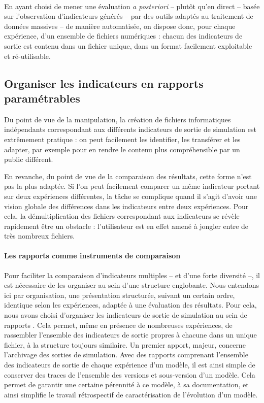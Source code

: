 	\paragraph*{}
	En ayant choisi de mener une évaluation \textit{a posteriori} -- plutôt qu'en direct -- basée sur l'observation d'indicateurs générés -- par des outils adaptés au traitement de données massives -- de manière automatisée, on dispose donc, pour chaque expérience, d'un ensemble de fichiers numériques : chacun des indicateurs  de sortie est contenu dans un fichier unique, dans un format facilement exploitable et ré-utilisable. 

	\subsection{Organiser les indicateurs en rapports paramétrables}

	Du point de vue de la manipulation, la création de fichiers informatiques indépendants correspondant aux différents indicateurs de sortie de simulation est extrêmement pratique : on peut facilement les identifier, les transférer et les adapter, par exemple pour en rendre le contenu plus compréhensible par un public différent.

	En revanche, du point de vue de la comparaison des résultats, cette forme n'est pas la plus adaptée.
	Si l'on peut facilement comparer un même indicateur portant sur deux expériences différentes, la tâche se complique quand il s'agit d'avoir une vision globale des différences dans les indicateurs entre deux expériences.
	Pour cela, la démultiplication des fichiers correspondant aux indicateurs se révèle rapidement être un obstacle : l'utilisateur est en effet amené à jongler entre de très nombreux fichiers.
	
	\paragraph{Les rapports comme instruments de comparaison}
	Pour faciliter la comparaison d'indicateurs multiples -- et d'une forte diversité --, il est nécessaire de les organiser au sein d'une structure englobante.
	Nous entendons ici par organisation, une présentation structurée, suivant un certain ordre, identique selon les expériences, adaptée à une évaluation des résultats.
	Pour cela, nous avons choisi d'organiser les indicateurs de sortie de simulation au sein de \og rapports \fg{}.
	Cela permet, même en présence de nombreuses expériences, de rassembler l'ensemble des indicateurs de sortie propres à chacune dans un unique fichier, à la structure toujours similaire.
	Un premier apport, majeur, concerne l'archivage des sorties de simulation.
	Avec des rapports comprenant l'ensemble des indicateurs de sortie de chaque expérience d'un modèle, il est ainsi simple de conserver des traces de l'ensemble des versions et sous-version d'un modèle.
	Cela permet de garantir une certaine pérennité à ce modèle, à sa documentation, et ainsi simplifie le travail rétrospectif de caractérisation de l'évolution d'un modèle.	
	
